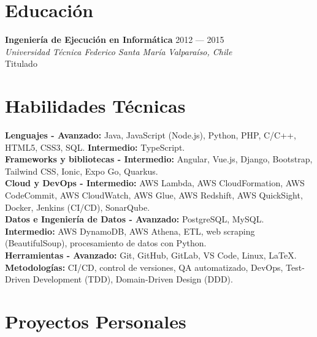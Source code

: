 \documentclass[11pt,a4paper]{article}
\begin{document}
\section*{Educación}
\textbf{Ingeniería de Ejecución en Informática} \hfill 2012 --- 2015\\
\textit{Universidad Técnica Federico Santa María} \hfill \textit{Valparaíso, Chile}\\
Titulado

\section*{Habilidades Técnicas}
\textbf{Lenguajes - Avanzado:} Java, JavaScript (Node.js), Python, PHP, C/C++, HTML5, CSS3, SQL. \textbf{Intermedio:} TypeScript.\\
\textbf{Frameworks y bibliotecas - Intermedio:} Angular, Vue.js, Django, Bootstrap, Tailwind CSS, Ionic, Expo Go, Quarkus.\\
\textbf{Cloud y DevOps - Intermedio:} AWS Lambda, AWS CloudFormation, AWS CodeCommit, AWS CloudWatch, AWS Glue, AWS Redshift, AWS QuickSight, Docker, Jenkins (CI/CD), SonarQube.\\
\textbf{Datos e Ingeniería de Datos - Avanzado:} PostgreSQL, MySQL.  \textbf{Intermedio:} AWS DynamoDB, AWS Athena, ETL, web scraping (BeautifulSoup), procesamiento de datos con Python.\\
\textbf{Herramientas - Avanzado:} Git, GitHub, GitLab, VS Code, Linux, \LaTeX.\\
\textbf{Metodologías:} CI/CD, control de versiones, QA automatizado, DevOps, Test-Driven Development (TDD), Domain-Driven Design (DDD).\\

\section*{Proyectos Personales}
\end{document}
